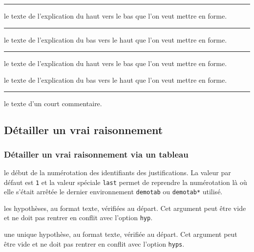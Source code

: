 \documentclass[12pt,a4paper]{article}
\theoremstyle{definition}
\newcommand\env[1]{\texttt{#1}}
\newcommand\separation{
    \medskip
    \hfill\rule{0.5\textwidth}{0.75pt}\hfill
    \medskip
}
\begin{document}
\separation



\IDarg{} le texte de l'explication du haut vers le bas que l'on veut mettre en forme.


\separation



\IDarg{} le texte de l'explication du bas vers le haut que l'on veut mettre en forme.


\separation



 le texte de l'explication du haut vers le bas que l'on veut mettre en forme.

 le texte de l'explication du bas vers le haut que l'on veut mettre en forme.


\separation



\IDarg{} le texte d'un court commentaire.








\subsection{Détailler un \og vrai \fg{} raisonnement}



\subsubsection{Détailler un \og vrai \fg{} raisonnement via un tableau}


 le début de la numérotation des identifiants des justifications.
              La valeur par défaut est \verb+1+ et la valeur spéciale \verb+last+ permet de reprendre la numérotation là où elle s'était arrêtée le dernier environnement \env{demotab} ou \env{demotab*} utilisé.

 les hypothèses, au format texte, vérifiées au départ.
              Cet argument peut être vide et ne doit pas rentrer en conflit avec l'option \verb+hyp+.

 une unique hypothèse, au format texte, vérifiée au départ.
              Cet argument peut être vide et ne doit pas rentrer en conflit avec l'option \verb+hyps+.
\end{document}
